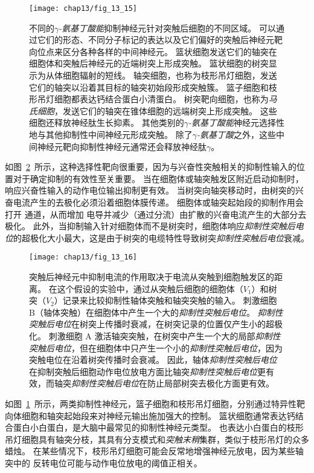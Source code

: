 \begin{figure}[htbp]
	\centering
	\texttt{[image: chap13/fig\_13\_15]}
	\caption{不同的\textit{$\gamma$-氨基丁酸能}抑制神经元针对突触后细胞的不同区域。
		可以通过它们的形态、不同分子标记的表达以及它们偏好的突触后神经元靶向位点来区分各种各样的中间神经元。
		篮状细胞发送它们的轴突在细胞体和突触后神经元的近端树突上形成突触。
		篮状细胞的树突显示为从体细胞辐射的短线。
		轴突细胞，也称为枝形吊灯细胞，发送它们的轴突以沿着其目标的轴突初始段形成突触簇。
		篮子细胞和枝形吊灯细胞都表达钙结合蛋白小清蛋白。
		树突靶向细胞，也称为\textit{马氏细胞}，发送它们的轴突在锥体细胞的远端树突上形成突触。
		这些细胞还释放神经肽生长抑素。
		其他类别的\textit{$\gamma$-氨基丁酸能}神经元选择性地与其他抑制性中间神经元形成突触。
		除了\textit{$\gamma$-氨基丁酸}之外，这些中间神经元靶向抑制性神经元通常还会释放神经肽$\gamma$。}
	\label{fig:13_15}
\end{figure}


如图~\ref{fig:13_16}~所示，这种选择性靶向很重要，因为与兴奋性突触相关的抑制性输入的位置对于确定抑制的有效性至关重要。
当在细胞体或轴突触发区附近启动抑制时，响应兴奋性输入的动作电位输出抑制更有效。
当树突向轴突移动时，由树突的兴奋电流产生的去极化必须沿着细胞体膜传递。
细胞体或轴突起始段的抑制作用会打开  通道，从而增加  电导并减少（通过分流）由扩散的兴奋电流产生的大部分去极化。
此外，当抑制输入针对细胞体而不是树突时，细胞体响应\textit{抑制性突触后电位}的超极化大小最大，这是由于树突的电缆特性导致树突\textit{抑制性突触后电位}衰减。


\begin{figure}[htbp]
	\centering
	\texttt{[image: chap13/fig\_13\_16]}
	\caption{突触后神经元中抑制电流的作用取决于电流从突触到细胞触发区的距离。
		在这个假设的实验中，通过从突触后细胞的细胞体（$ V_1 $）和树突（$ V_2 $）记录来比较抑制性轴体突触和轴突突触的输入。
		刺激细胞 B（轴体突触）在细胞体中产生一个大的\textit{抑制性突触后电位}。
		\textit{抑制性突触后电位}在树突上传播时衰减，在树突记录的位置仅产生小的超极化。
		刺激细胞 A 激活轴突突触，在树突中产生一个大的局部\textit{抑制性突触后电位}，但在细胞体中只产生一个小的\textit{抑制性突触后电位}，因为突触电位在沿着树突传播时会衰减。
		因此，轴体\textit{抑制性突触后电位}在抑制突触后细胞动作电位放电方面比轴突\textit{抑制性突触后电位}更有效，而轴突\textit{抑制性突触后电位}在防止局部树突去极化方面更有效。}
	\label{fig:13_16}
\end{figure}


如图~\ref{fig:13_15}~所示，两类抑制性神经元，篮子细胞和枝形吊灯细胞，分别通过特异性靶向体细胞和轴突起始段来对神经元输出施加强大的控制。
篮状细胞通常表达钙结合蛋白小白蛋白，是大脑中最常见的抑制性神经元类型。
也表达小白蛋白的枝形吊灯细胞具有轴突分枝，其具有分支模式和\textit{突触末稍}集群，类似于枝形吊灯的众多蜡烛。
在某些情况下，枝形吊灯细胞可能会反常地增强神经元放电，因为某些轴突中的  反转电位可能与动作电位放电的阈值正相关。


